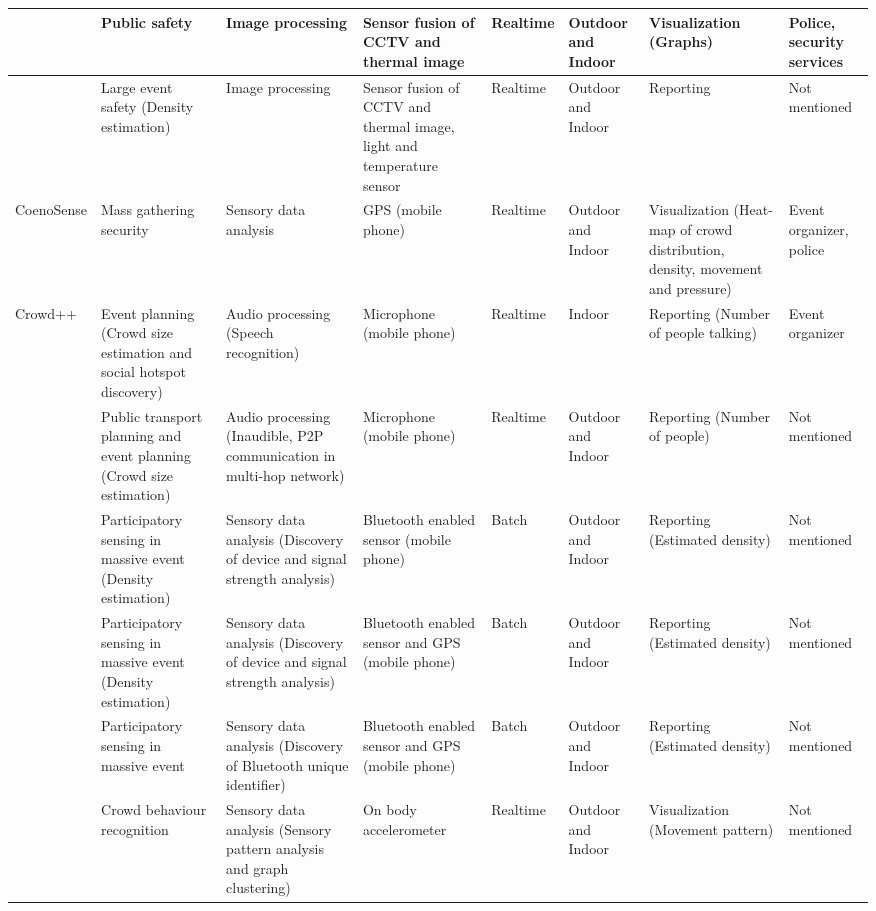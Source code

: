 \begin{center}
\begin{longtable}{|p{1.8cm}|p{2cm}|p{2cm}|p{1.8cm}|p{1.3cm}|p{1.3cm}|}
		\hline
		\citet{Andersson2009} & Public safety & Image processing & Sensor fusion of CCTV and thermal image & Realtime & Outdoor and Indoor & Visualization (Graphs) & Police, security services \\
		\hline
		\citet{Yaseen2013} & Large event safety (Density estimation) & Image processing & Sensor fusion of CCTV and thermal image, light and temperature sensor& Realtime & Outdoor and Indoor & Reporting & Not mentioned \\
		\hline
		CoenoSense \citep{Wirz2012} & Mass gathering security & Sensory data analysis & GPS (mobile phone) & Realtime & Outdoor and Indoor & Visualization (Heat-map of crowd distribution, density, movement and pressure) & Event organizer, police \\
		\hline
		Crowd++ \citep{Xu2013} & Event planning (Crowd size estimation and social hotspot discovery) & Audio processing (Speech recognition) & Microphone (mobile phone) & Realtime & Indoor & Reporting (Number of people talking) & Event organizer \\
		\hline
		\citet{Kannan2012} & Public transport planning and  event planning (Crowd size estimation) & Audio processing (Inaudible, P2P communication in multi-hop network) & Microphone (mobile phone) & Realtime & Outdoor and Indoor & Reporting (Number of people) & Not mentioned \\
		\hline
		\citet{Weppner2011} & Participatory sensing in massive event (Density estimation) & Sensory data analysis (Discovery of device and signal strength analysis) & Bluetooth enabled sensor (mobile phone) & Batch & Outdoor and Indoor & Reporting (Estimated density) & Not mentioned \\
		\hline
		\citet{Weppner2013} & Participatory sensing in massive event (Density estimation) & Sensory data analysis (Discovery of device and signal strength analysis) & Bluetooth enabled sensor and GPS (mobile phone) & Batch & Outdoor and Indoor & Reporting (Estimated density) & Not mentioned \\
		\hline
		\citet{Stopczynski2013} & Participatory sensing in massive event & Sensory data analysis (Discovery of Bluetooth unique identifier) & Bluetooth enabled sensor and GPS (mobile phone) & Batch & Outdoor and Indoor & Reporting (Estimated density) & Not mentioned \\
		\hline
		\citet{Roggen2011} & Crowd behaviour recognition & Sensory data analysis (Sensory pattern analysis and graph clustering) & On body accelerometer & Realtime & Outdoor and Indoor & Visualization (Movement pattern) & Not mentioned \\

\end{longtable}
\end{center}
